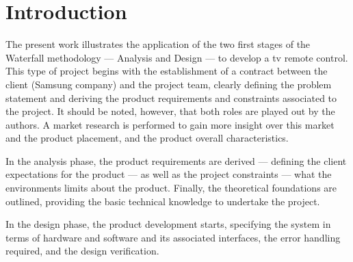 %
%
%
\chapter{Introduction}%
\label{ch:introduction}
The present work illustrates the application of the two first stages of the Waterfall methodology
--- Analysis and Design --- to develop a \gls{tv} remote control. This type of project
begins with the establishment of a contract between the client (Samsung company)
and the project team, clearly defining the problem statement and deriving the
product requirements and constraints associated to the project. It should be
noted, however, that both roles are played out by the authors.
A market
research is performed to gain more insight over this market and the
product placement, and the product overall characteristics.

In the analysis
phase, the product requirements are derived --- defining the client expectations
for the product --- as well as the project constraints --- what the environments
limits about the product. Finally, the theoretical foundations are outlined,
providing the basic technical knowledge to undertake the project.

In the design phase, the product development starts, specifying the system in
terms of hardware and software and its associated interfaces, the error handling
required, and the design verification.
%
  \vspace{-5mm}





%
